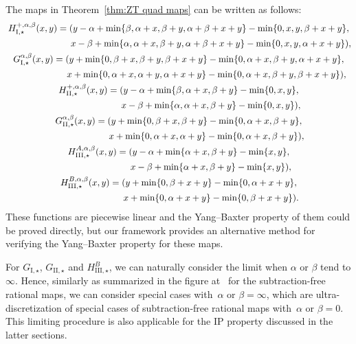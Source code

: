 \documentclass[pdftex]{sigma}
\numberwithin{equation}{section}
\def\a{{\alpha}}
\def\b{{\beta}}
\begin{document}
The maps in Theorem~\ref{thm:ZT quad maps} can be
written as follows:
\begin{gather*}
H_{\mathrm{I},\star}^{+,\alpha,\beta}(x,y)=(y-\alpha+\min\{\beta,\alpha+x,\beta+y,\alpha+\beta+x+y\}-\min\{0,x,y,\beta+x+y\},\\
\hphantom{H_{\mathrm{I},\star}^{+,\alpha,\beta}(x,y)=(}{}
 x-\beta+\min\{\alpha,\alpha+x,\beta+y,\alpha+\beta+x+y\}-\min\{0,x,y,\alpha+x+y\}),\\
G_{\mathrm{I},\star}^{\alpha,\beta}(x,y)=(y+\min\{0,\beta+x,\beta+y,\beta+x+y\}-\min\{0,\alpha+x,\beta+y,\alpha+x+y\},\\
\hphantom{G_{\mathrm{I},\star}^{\alpha,\beta}(x,y)=(}{}
 x+\min\{0,\alpha+x,\alpha+y,\alpha+x+y\}-\min\{0,\alpha+x,\beta+y,\beta+x+y\}),\\
H_{\mathrm{II},\star}^{+,\alpha,\beta}(x,y)=(y-\alpha+\min\{\beta,\alpha+x,\beta+y\}-\min\{0,x,y\},\\
\hphantom{H_{\mathrm{II},\star}^{+,\alpha,\beta}(x,y)=(}{}
 x-\beta+\min\{\alpha,\alpha+x,\beta+y\}
-\min\{0,x,y\}),\\
G_{\mathrm{II},\star}^{\alpha,\beta}(x,y)=(y+\min\{0,\beta+x,\beta+y\}
-\min\{0,\alpha+x,\beta+y\},\\
\hphantom{G_{\mathrm{II},\star}^{\alpha,\beta}(x,y)=(}{}
 x+\min\{0,\alpha+x,\alpha+y\}-\min\{0,\alpha+x,\beta+y\}),\\
H_{\mathrm{III},\star}^{A,\alpha,\beta}(x,y)=(y-\alpha+\min\{\alpha+x,\beta+y\}-\min\{x,y\},\\
\hphantom{H_{\mathrm{III},\star}^{A,\alpha,\beta}(x,y)=(}{}
 x-\beta+\min\{\alpha+x,\beta+y\}-\min\{x,y\}),\\
H_{\mathrm{III},\star}^{B,\alpha,\beta}(x,y)=(y+\min\{0,\beta+x+y\}-\min\{0,\alpha+x+y\},\\
\hphantom{H_{\mathrm{III},\star}^{B,\alpha,\beta}(x,y)=(}{}
 x+\min\{0,\alpha+x+y\}-\min\{0,\beta+x+y\}).
\end{gather*}
These functions are piecewise linear and the Yang--Baxter property of them could be proved directly, but
our framework provides an alternative method for verifying the Yang--Baxter property for these maps.

\begin{Remark}
For $G_{\mathrm{I},\star}$, $G_{\mathrm{II},\star}$ and $H_{\mathrm{III},\star}^{B}$, we can naturally consider the limit when $\a$ or $\b$ tend to $\infty$. Hence, similarly as summarized in the figure at~\cite[p.~4]{SU} for the subtraction-free rational maps, we can consider special cases with~$\a$ or $\b=\infty$, which are ultra-discretization of special cases of subtraction-free rational maps with~$\a$ or $\b=0$. This limiting procedure is also applicable for the IP property discussed in the latter sections.
\end{Remark}
\end{document}
